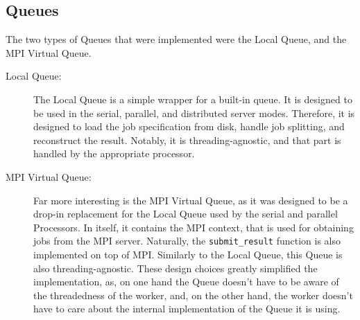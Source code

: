 \documentclass[a4paper]{article}
\begin{document}
	\subsection{Queues}
	The two types of Queues that were implemented were the Local Queue, and the MPI Virtual Queue.
	\begin{description}
		\item[Local Queue:] The Local Queue is a simple wrapper for a built-in queue. It is designed to be used in the serial, parallel, and distributed server modes. Therefore, it is designed to load the job specification from disk, handle job splitting, and reconstruct the result. Notably, it is threading-agnostic, and that part is handled by the appropriate processor.
		\item[MPI Virtual Queue:] Far more interesting is the MPI Virtual Queue, as it was designed to be a drop-in replacement for the Local Queue used by the serial and parallel Processors. In itself, it contains the MPI context, that is used for obtaining jobs from the MPI server. Naturally, the \texttt{submit\_result} function is also implemented on top of MPI. Similarly to the Local Queue, this Queue is also threading-agnostic. These design choices greatly simplified the implementation, as, on one hand the Queue doesn't have to be aware of the threadedness of the worker, and, on the other hand, the worker doesn't have to care about the internal implementation of the Queue it is using.
	\end{description}
	
\end{document}
